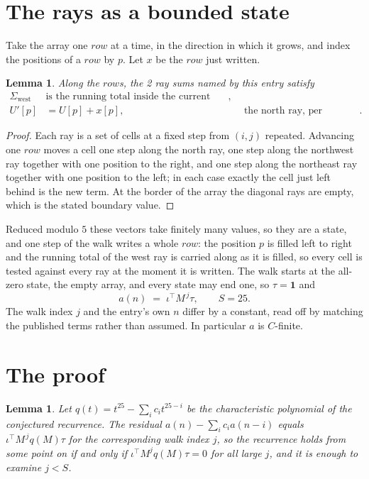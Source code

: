 \documentclass[11pt,a4paper]{article}
\theoremstyle{plain}
\newtheorem{lemma}[theorem]{Lemma}
\theoremstyle{definition}
\begin{document}
\section{The rays as a bounded state}

Take the array one $row$ at a time, in the direction in which it grows, and index the
positions of a $row $ by $p$. Let $x$ be the $row$ just written.

\begin{lemma}\label{lem:rays}
Along the $row$s, the 2 ray sums named by this entry satisfy
\[
\begin{aligned}
\Sigma_{\mathrm{west}}\ &\text{is the running total inside the current row},\\
U'[p]&=U[p]+x[p], &&\text{the north ray, per position} .
\end{aligned}
\]
\end{lemma}

\begin{proof}
Each ray is a set of cells at a fixed step from $(i,j)$ repeated. Advancing one $row$
moves a cell one step along the north ray, one step along the northwest ray together with one
position to the right, and one step along the northeast ray together with one position to the
left; in each case exactly the cell just left behind is the new term. At the border of the
array the diagonal rays are empty, which is the stated boundary value.
\end{proof}

Reduced modulo $5$ these vectors take finitely many values, so they are a state, and one step
of the walk writes a whole $row$: the position $p$ is filled left to right and the
running total of the west ray is carried along as it is filled, so every cell is tested
against every ray at the moment it is written. The walk starts at the all-zero state, the empty
array, and every state may end one, so $\tau=\mathbf{1}$ and
\[
a(n)\;=\;\iota^{\!\top}M^{\,j}\tau ,\qquad S=25.
\]
The walk index $j$ and the entry's own $n$ differ by a constant, read off by matching the
published terms rather than assumed. In particular $a$ is $C$-finite.

\section{The proof}

\begin{lemma}\label{lem:crit}
Let $q(t)=t^{25}-\sum_i c_it^{25-i}$ be the characteristic polynomial of the
conjectured recurrence. The residual $a(n)-\sum_ic_ia(n-i)$ equals
$\iota^{\!\top}M^{\,j}q(M)\tau$ for the corresponding walk index $j$, so the recurrence
holds from some point on if and only if $\iota^{\!\top}M^{j}q(M)\tau=0$ for all large $j$,
and it is enough to examine $j<S$.
\end{lemma}
\end{document}
